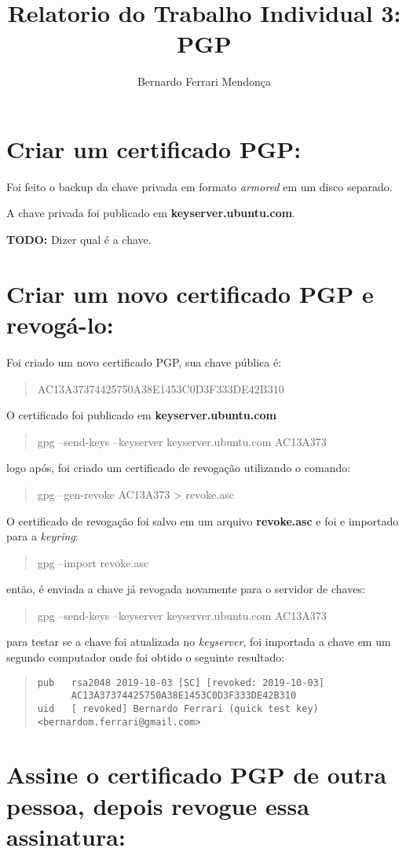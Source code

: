 \documentclass[12pt, letterpaper]{article}
\title{Relatorio do Trabalho Individual 3: PGP}
\author{Bernardo Ferrari Mendonça}
\begin{document}
\maketitle

\section{Criar um certificado PGP:}

Foi feito o backup da chave privada em formato \textit{armored} em um disco separado.

A chave privada foi publicado em \textbf{keyserver.ubuntu.com}.

\textbf{TODO:} Dizer qual é a chave.

\section{Criar um novo certificado PGP e revogá-lo:}

Foi criado um novo certificado PGP, sua chave pública é:

\begin{quote}
  AC13A37374425750A38E1453C0D3F333DE42B310
\end{quote}

O certificado foi publicado em \textbf{keyserver.ubuntu.com}
\begin{quote}
  gpg --send-keys --keyserver keyserver.ubuntu.com AC13A373
\end{quote}
logo após, foi criado um certificado de revogação utilizando o comando:

\begin{quote}
  gpg --gen-revoke AC13A373 \textgreater{} revoke.asc
\end{quote}

O certificado de revogação foi salvo em um arquivo \textbf{revoke.asc}
e foi e importado para a \textit{keyring}:
\begin{quote}
  gpg --import revoke.asc
\end{quote}
então, é enviada a chave já revogada novamente para o servidor de chaves:
\begin{quote}
  gpg --send-keys --keyserver keyserver.ubuntu.com AC13A373
\end{quote}
para testar se a chave foi atualizada no \textit{keyserver},
foi importada a chave em um segundo computador onde foi obtido o seguinte resultado:

\begin{quote}
\begin{verbatim}
pub   rsa2048 2019-10-03 [SC] [revoked: 2019-10-03]
      AC13A37374425750A38E1453C0D3F333DE42B310
uid   [ revoked] Bernardo Ferrari (quick test key)
<bernardom.ferrari@gmail.com>
\end{verbatim}
\end{quote}

\section{Assine o certificado PGP de outra pessoa, depois revogue essa assinatura:}
\end{document}
